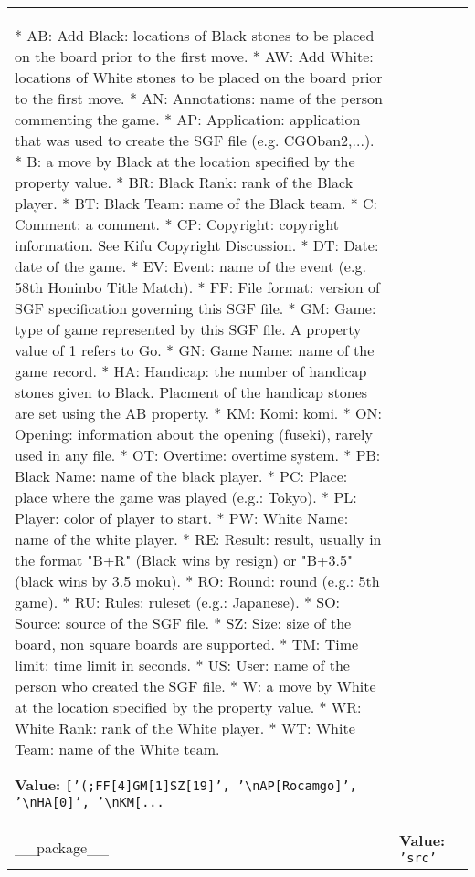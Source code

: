 \begin{longtable}{|p{\varnamewidth}|p{\vardescrwidth}|l}
          * AB: Add Black: locations of Black stones to be placed on the 
          board prior to the first move. * AW: Add White: locations of 
          White stones to be placed on the board prior to the first move. *
          AN: Annotations: name of the person commenting the game. * AP: 
          Application: application that was used to create the SGF file 
          (e.g. CGOban2,...). * B: a move by Black at the location 
          specified by the property value. * BR: Black Rank: rank of the 
          Black player. * BT: Black Team: name of the Black team. * C: 
          Comment: a comment. * CP: Copyright: copyright information. See 
          Kifu Copyright Discussion. * DT: Date: date of the game. * EV: 
          Event: name of the event (e.g. 58th Honinbo Title Match). * FF: 
          File format: version of SGF specification governing this SGF 
          file. * GM: Game: type of game represented by this SGF file. A 
          property value of 1 refers to Go. * GN: Game Name: name of the 
          game record. * HA: Handicap: the number of handicap stones given 
          to Black. Placment of the handicap stones are set using the AB 
          property. * KM: Komi: komi. * ON: Opening: information about the 
          opening (fuseki), rarely used in any file. * OT: Overtime: 
          overtime system. * PB: Black Name: name of the black player. * 
          PC: Place: place where the game was played (e.g.: Tokyo). * PL: 
          Player: color of player to start. * PW: White Name: name of the 
          white player. * RE: Result: result, usually in the format "B+R" 
          (Black wins by resign) or "B+3.5" (black wins by 3.5 moku). * RO:
          Round: round (e.g.: 5th game). * RU: Rules: ruleset (e.g.: 
          Japanese). * SO: Source: source of the SGF file. * SZ: Size: size
          of the board, non square boards are supported. * TM: Time limit: 
          time limit in seconds. * US: User: name of the person who created
          the SGF file. * W: a move by White at the location specified by 
          the property value. * WR: White Rank: rank of the White player. *
          WT: White Team: name of the White team.

\textbf{Value:} 
{\tt \texttt{[}\texttt{'}\texttt{(;FF[4]GM[1]SZ[19]}\texttt{'}\texttt{, }\texttt{'}\texttt{{\textbackslash}nAP[Rocamgo]}\texttt{'}\texttt{, }\texttt{'}\texttt{{\textbackslash}nHA[0]}\texttt{'}\texttt{, }\texttt{'}\texttt{{\textbackslash}nKM[}\texttt{...}}&\\
\cline{1-2}
\raggedright \_\-\_\-p\-a\-c\-k\-a\-g\-e\-\_\-\_\- & \raggedright \textbf{Value:} 
{\tt \texttt{'}\texttt{src}\texttt{'}}&\\
\cline{1-2}
\end{longtable}

